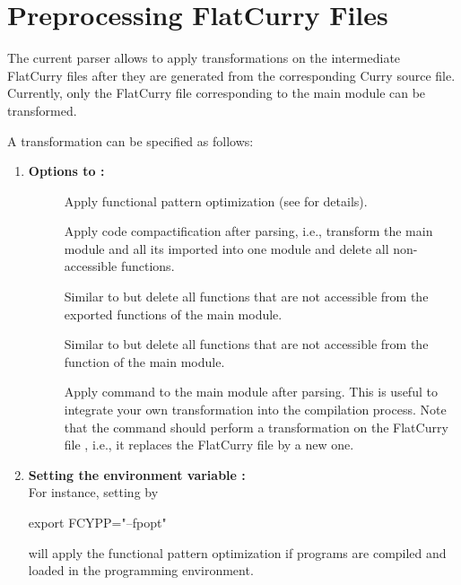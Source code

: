 \section{Preprocessing FlatCurry Files}
\label{sec-pakcspp}

The current parser allows to apply transformations on the intermediate
FlatCurry files after they are generated from the
corresponding Curry source file.
Currently, only the FlatCurry file corresponding to the main module
can be transformed.

A transformation can be specified as follows:
\begin{enumerate}
\item {\bf Options to :}
\begin{description}
\item[]
Apply functional pattern optimization
(see  for details).

\item[]
Apply code compactification after parsing, i.e., transform the main
module and all its imported into one module and delete all
non-accessible functions.

\item[]
Similar to  but delete all functions that are not accessible
from the exported functions of the main module.

\item[]
Similar to  but delete all functions that are not accessible
from the function  of the main module.

\item[]
Apply command  to the main module after parsing. This is useful to
integrate your own transformation into the compilation process.
Note that the command  should perform a transformation
on the FlatCurry file , i.e., it replaces the FlatCurry
file by a new one.
\end{description}

\item {\bf Setting the environment variable :}\\
For instance, setting  by
\begin{curry}
export FCYPP="--fpopt"
\end{curry}
will apply the functional pattern optimization if programs are compiled
and loaded in the \CYS programming environment.



\end{enumerate}
